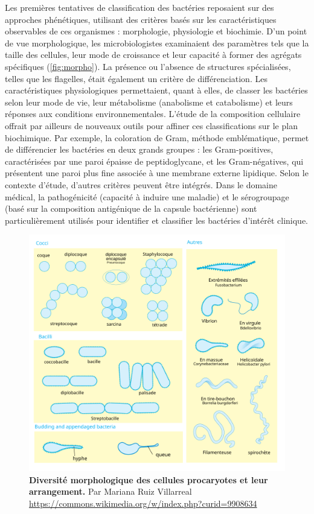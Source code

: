 Les premières tentatives de classification des bactéries reposaient sur des approches phénétiques, utilisant des critères basés sur les caractéristiques observables de ces organismes : morphologie, physiologie et biochimie.
D'un point de vue morphologique, les microbiologistes examinaient des paramètres tels que la taille des cellules, leur mode de croissance et leur capacité à former des agrégats spécifiques (\autoref{fig:morpho}). La présence ou l'absence de structures spécialisées, telles que les flagelles, était également un critère de différenciation. 
Les caractéristiques physiologiques permettaient, quant à elles, de classer les bactéries selon leur mode de vie, leur métabolisme (anabolisme et catabolisme) et leurs réponses aux conditions environnementales.
L'étude de la composition cellulaire offrait par ailleurs de nouveaux outils pour affiner ces classifications sur le plan biochimique. Par exemple, la coloration de Gram, méthode emblématique, permet de différencier les bactéries en deux grands groupes : les Gram-positives, caractérisées par une paroi épaisse de peptidoglycane, et les Gram-négatives, qui présentent une paroi plus fine associée à une membrane externe lipidique.
Selon le contexte d’étude, d'autres critères peuvent être intégrés. Dans le domaine médical, la pathogénicité (capacité à induire une maladie) et le sérogroupage (basé sur la composition antigénique de la capsule bactérienne) sont particulièrement utilisés pour identifier et classifier les bactéries d'intérêt clinique.

\begin{figure}[htbp]
    \centering
    \includegraphics[width=.65\textwidth, keepaspectratio]{images/Bacterial_morphology_diagram-fr.png}
    \caption[Morphologie et arrangement cellulaire procaryote]{\textbf{Diversité morphologique des cellules procaryotes et leur arrangement.} Par Mariana Ruiz Villarreal \url{https://commons.wikimedia.org/w/index.php?curid=9908634}}
    \label{fig:morpho}
\end{figure}

